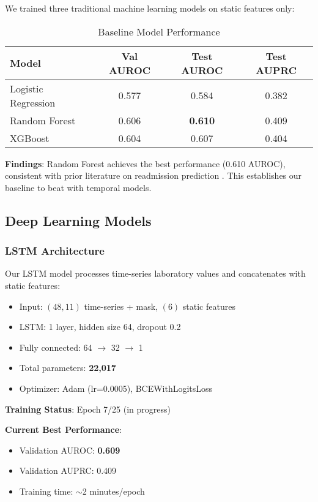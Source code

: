\documentclass[conference]{IEEEtran}
\begin{document}
We trained three traditional machine learning models on static features only:

\begin{table}[h]
\centering
\caption{Baseline Model Performance}
\label{tab:baselines}
\begin{tabular}{lccc}
\toprule
\textbf{Model} & \textbf{Val AUROC} & \textbf{Test AUROC} & \textbf{Test AUPRC} \\
\midrule
Logistic Regression & 0.577 & 0.584 & 0.382 \\
Random Forest & 0.606 & \textbf{0.610} & 0.409 \\
XGBoost & 0.604 & 0.607 & 0.404 \\
\bottomrule
\end{tabular}
\end{table}

\textbf{Findings}: Random Forest achieves the best performance (0.610 AUROC), consistent with prior literature on readmission prediction \cite{kansagara2011}. This establishes our baseline to beat with temporal models.

\subsection{Deep Learning Models}

\subsubsection{LSTM Architecture}

Our LSTM model processes time-series laboratory values and concatenates with static features:

\begin{itemize}
    \item Input: $(48, 11)$ time-series + mask, $(6)$ static features
    \item LSTM: 1 layer, hidden size 64, dropout 0.2
    \item Fully connected: 64 $\rightarrow$ 32 $\rightarrow$ 1
    \item Total parameters: \textbf{22,017}
    \item Optimizer: Adam (lr=0.0005), BCEWithLogitsLoss
\end{itemize}

\textbf{Training Status}: Epoch 7/25 (in progress)

\textbf{Current Best Performance}:
\begin{itemize}
    \item Validation AUROC: \textbf{0.609}
    \item Validation AUPRC: 0.409
    \item Training time: $\sim$2 minutes/epoch
\end{itemize}
\end{document}
